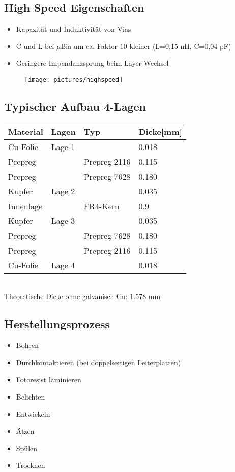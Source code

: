 \subsection{High Speed Eigenschaften}
\begin{itemize}
  \item Kapazität und Induktivität von Vias
  \item C und L bei $\mu$Bia um ca. Faktor 10 kleiner (L=0,15 nH, C=0,04 pF)
  \item Geringere Impendanzsprung beim Layer-Wechsel
\end{itemize}

\begin{figure}[htb]
\texttt{[image: pictures/highspeed]}
\end{figure}

\subsection{Typischer Aufbau 4-Lagen}
\begin{tabular}{|l|l|l|l|}
\hline
Material&Lagen&Typ&Dicke[mm]\\
\hline
Cu-Folie&Lage 1&&0.018\\
\hline
Prepreg&&Prepreg 2116&0.115\\
\hline
Prepreg&&Prepreg 7628&0.180\\
\hline
Kupfer&Lage 2&&0.035\\
\hline
Innenlage&&FR4-Kern&0.9\\
\hline
Kupfer&Lage 3&&0.035\\
\hline
Prepreg&&Prepreg 7628&0.180\\
\hline
Prepreg&&Prepreg 2116&0.115\\
\hline
Cu-Folie&Lage 4&&0.018\\
\hline
\end{tabular}
\\
Theoretische Dicke ohne galvanisch Cu: 1.578 mm

\subsection{Herstellungsprozess}
\begin{itemize}
  \item Bohren
  \item Durchkontaktieren (bei doppelseitigen Leiterplatten)
  \item Fotoresist laminieren
  \item Belichten
  \item Entwickeln
  \item Ätzen
  \item Spülen 
  \item Trocknen
\end{itemize}

